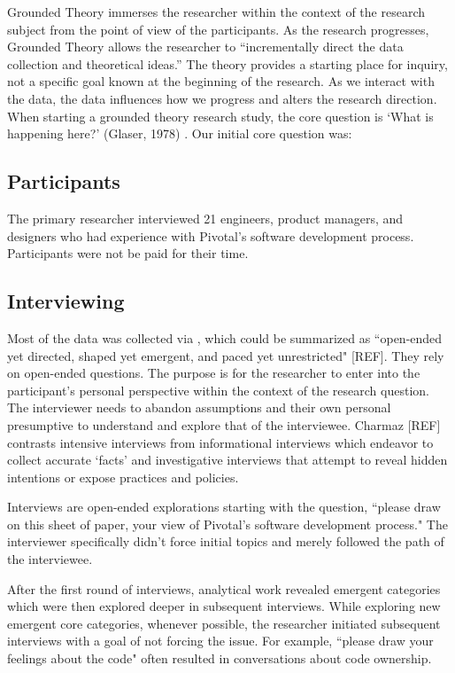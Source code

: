 Grounded Theory immerses the researcher within the context of the research subject from the point of view of the participants. As the research progresses, Grounded Theory allows the researcher to “incrementally direct the data collection and theoretical ideas.” The theory provides a starting place for inquiry, not a specific goal known at the beginning of the research. As we interact with the data, the data influences how we progress and alters the research direction. When starting a grounded theory research study, the core question is `What is happening here?' (Glaser, 1978) \cite{GlaserTheoreticalSensitivity}. Our initial core question was: 

\subsection{Participants}
The primary researcher interviewed 21 engineers, product managers, and designers who had experience with Pivotal's software development process. Participants were not be paid for their time. 
\subsection{Interviewing}

Most of the data was collected via , which could be summarized as “open-ended yet directed, shaped yet emergent, and paced yet unrestricted" [REF].
They rely on open-ended questions. The purpose is for the researcher to enter into the participant's personal perspective within the context of the research question. The interviewer needs to abandon assumptions and their own personal presumptive to understand and explore that of the interviewee. Charmaz [REF] contrasts intensive interviews from informational interviews which endeavor to collect accurate `facts' and investigative interviews that attempt to reveal hidden intentions or expose practices and policies. 
 
Interviews are open-ended explorations starting with the question, ``please draw on this sheet of paper, your view of Pivotal's software development process." The interviewer specifically didn't force initial topics and merely followed the path of the interviewee. 

After the first round of interviews, analytical work revealed emergent categories which were then explored deeper in subsequent interviews. While exploring new emergent core categories, whenever possible, the researcher initiated subsequent interviews with a goal of not forcing the issue. For example, ``please draw your feelings about the code" often resulted in conversations about code ownership. 

